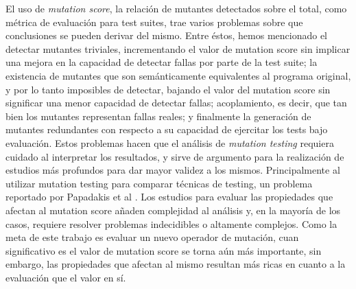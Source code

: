 El uso de \emph{mutation score}, la relaci\'on de mutantes detectados sobre el total, como m\'etrica de evaluaci\'on para test suites, trae varios problemas sobre que conclusiones se pueden derivar del mismo. Entre \'estos, hemos mencionado el detectar mutantes triviales, incrementando el valor de mutation score sin implicar una mejora en la capacidad de detectar fallas por parte de la test suite; la existencia de mutantes que son sem\'anticamente equivalentes al programa original, y por lo tanto imposibles de detectar, bajando el valor del mutation score sin significar una menor capacidad de detectar fallas; acoplamiento, es decir, que tan bien los mutantes representan fallas reales; y finalmente la generaci\'on de mutantes redundantes con respecto a su capacidad de ejercitar los tests bajo evaluaci\'on. Estos problemas hacen que el an\'alisis de \emph{mutation testing} requiera cuidado al interpretar los resultados, y sirve de argumento para la realizaci\'on de estudios m\'as profundos para dar mayor validez a los mismos. Principalmente al utilizar mutation testing para comparar t\'ecnicas de testing, un problema reportado por Papadakis et al \cite{bibliography.mutation.evaluation.PapadakisHHJT16}. Los estudios para evaluar las propiedades que afectan al mutation score a\~naden complejidad al an\'alisis y, en la mayor\'ia de los casos, requiere resolver problemas indecidibles o altamente complejos. Como la meta de este trabajo es evaluar un nuevo operador de mutaci\'on, cuan significativo es el valor de mutation score se torna a\'un m\'as importante, sin embargo, las propiedades que afectan al mismo resultan m\'as ricas en cuanto a la evaluaci\'on que el valor en s\'i.

